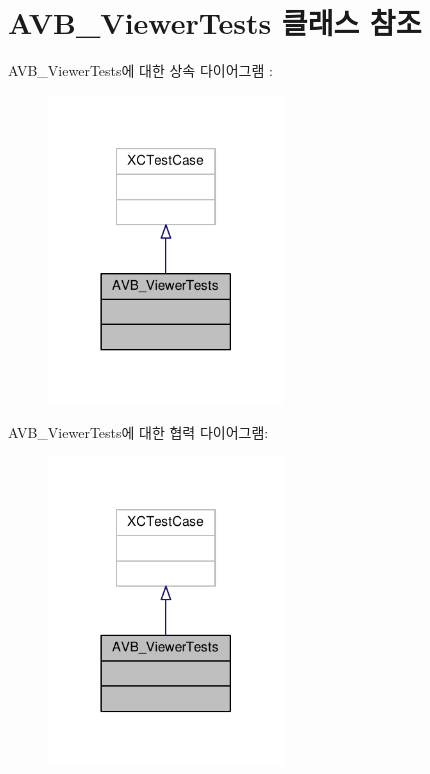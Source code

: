 \hypertarget{interface_a_v_b___viewer_tests}{}\section{A\+V\+B\+\_\+\+Viewer\+Tests 클래스 참조}
\label{interface_a_v_b___viewer_tests}


A\+V\+B\+\_\+\+Viewer\+Tests에 대한 상속 다이어그램 \+: 
\nopagebreak
\begin{figure}[H]
\begin{center}
\leavevmode
\includegraphics[width=177pt]{interface_a_v_b___viewer_tests__inherit__graph}
\end{center}
\end{figure}


A\+V\+B\+\_\+\+Viewer\+Tests에 대한 협력 다이어그램\+:
\nopagebreak
\begin{figure}[H]
\begin{center}
\leavevmode
\includegraphics[width=177pt]{interface_a_v_b___viewer_tests__coll__graph}
\end{center}
\end{figure}


